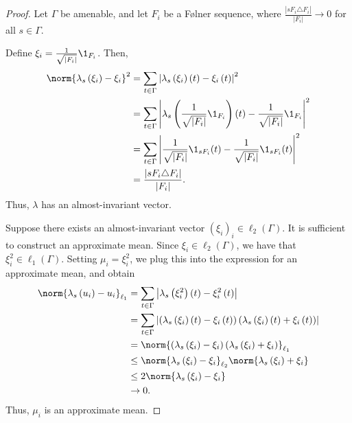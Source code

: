 \documentclass[10pt]{mypackage}
\begin{document}
\begin{proof}
  Let $\Gamma$ be amenable, and let $F_i$ be a Følner sequence, where $\frac{\left\vert sF_i\triangle F_i \right\vert}{\left\vert F_i \right\vert}\rightarrow 0$ for all $s\in\Gamma$.\newline

  Define $\xi_i = \frac{1}{\sqrt{\left\vert F_i \right\vert}}\1_{F_i}$. Then,
  \begin{align*}
    \norm{\lambda_{s}\left(\xi_i\right) - \xi_i}^2 &= \sum_{t\in\Gamma} \left\vert \lambda_{s}\left(\xi_i\right)\left(t\right) - \xi_i\left(t\right) \right\vert^2\\
                                                   &= \sum_{t\in\Gamma} \left\vert \lambda_s\left(\frac{1}{\sqrt{\left\vert F_i \right\vert}}\1_{F_i}\right)\left(t\right) - \frac{1}{\sqrt{\left\vert F_i \right\vert}}\1_{F_i} \right\vert^2\\
                                                   &= \sum_{t\in\Gamma}\left\vert \frac{1}{\sqrt{\left\vert F_i \right\vert}}\1_{sF_i}(t) - \frac{1}{\sqrt{\left\vert F_i \right\vert}}\1_{sF_i}(t) \right\vert^2\\
                                                   &= \frac{\left\vert sF_i\triangle F_i \right\vert}{\left\vert F_i \right\vert}.
  \end{align*}
  Thus, $\lambda$ has an almost-invariant vector.\newline

  Suppose there exists an almost-invariant vector $\left(\xi_i\right)_i\in \ell_2\left(\Gamma\right)$. It is sufficient to construct an approximate mean. Since $\xi_i\in \ell_2\left(\Gamma\right)$, we have that $\xi_i^2\in \ell_1\left(\Gamma\right)$. Setting $\mu_i = \xi_i^2$, we plug this into the expression for an approximate mean, and obtain
  \begin{align*}
    \norm{\lambda_s\left(u_i\right) - u_i}_{\ell_1} &= \sum_{t\in\Gamma}\left\vert \lambda_s\left(\xi_i^2\right)\left(t\right) - \xi_i^2\left(t\right) \right\vert\\
                                                    &= \sum_{t\in\Gamma}\left\vert \left(\lambda_s\left(\xi_i\right)\left(t\right) - \xi_i\left(t\right)\right)\left(\lambda_s\left(\xi_i\right)\left(t\right) + \xi_i\left(t\right)\right) \right\vert\\
                                                    &= \norm{\left(\lambda_s\left(\xi_i\right) - \xi_i\right)\left(\lambda_s\left(\xi_i\right) + \xi_i\right)}_{\ell_1}\\
                                                    &\leq \norm{\lambda_s\left(\xi_i\right) - \xi_i}_{\ell_2}\norm{\lambda_s\left(\xi_i\right) + \xi_{i}}\\
                                                    &\leq 2\norm{\lambda_s\left(\xi_i\right) - \xi_i}\\
                                                    &\rightarrow 0.
  \end{align*}
  Thus, $\mu_i$ is an approximate mean.
\end{proof}
\end{document}
